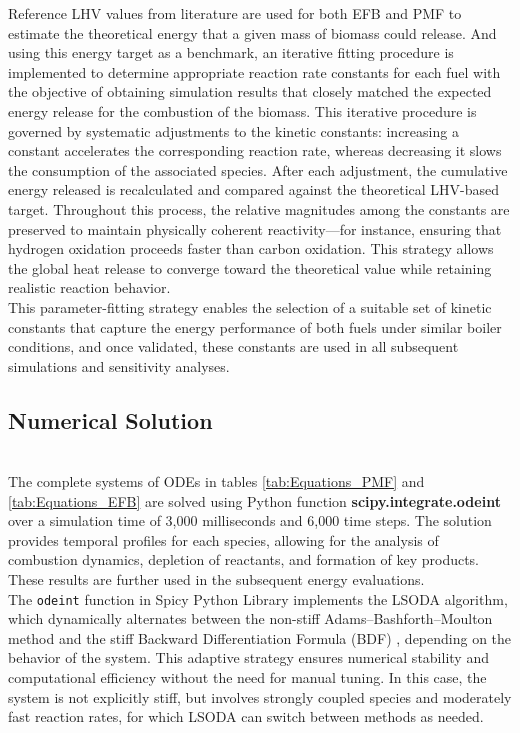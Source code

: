 \documentclass[preprint,12pt]{elsarticle}
\begin{document}
Reference LHV values from literature are used for both EFB and PMF to estimate the theoretical energy that a given mass of biomass could release. And using this energy target as a benchmark, an iterative fitting procedure is implemented to determine appropriate reaction rate constants for each fuel with the objective of obtaining simulation results that closely matched the expected energy release for the combustion of the biomass. This iterative procedure is governed by systematic adjustments to the kinetic constants: increasing a constant accelerates the corresponding reaction rate, whereas decreasing it slows the consumption of the associated species. After each adjustment, the cumulative energy released is recalculated and compared against the theoretical LHV-based target. Throughout this process, the relative magnitudes among the constants are preserved to maintain physically coherent reactivity—for instance, ensuring that hydrogen oxidation proceeds faster than carbon oxidation. This strategy allows the global heat release to converge toward the theoretical value while retaining realistic reaction behavior.\\





This parameter-fitting strategy enables the selection of a suitable set of kinetic constants that capture the energy performance of both fuels under similar boiler conditions, and once validated, these constants are used in all subsequent simulations and sensitivity analyses.\\

\subsection{Numerical Solution}\\

The complete systems of ODEs in tables \ref{tab:Equations_PMF} and \ref{tab:Equations_EFB} are solved using Python function \textbf{scipy.\-integrate.\-odeint}
 over a simulation time of 3,000 milliseconds and 6,000 time steps. The solution provides temporal profiles for each species, allowing for the analysis of combustion dynamics, depletion of reactants, and formation of key products. These results are further used in the subsequent energy evaluations.\\

The \texttt{odeint} function in Spicy Python Library implements the LSODA algorithm, which dynamically alternates between the non-stiff Adams--Bashforth--Moulton method and the stiff Backward Differentiation Formula (BDF) \cite{HindmarshODEPACK}, depending on the behavior of the system. This adaptive strategy ensures numerical stability and computational efficiency without the need for manual tuning. In this case, the system is not explicitly stiff, but involves strongly coupled species and moderately fast reaction rates, for which LSODA can switch between methods as needed.\\
\end{document}
